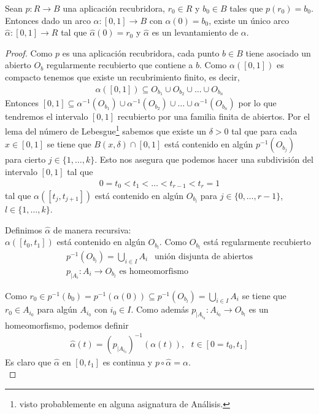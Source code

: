 \begin{lema}
    Sean $p:R\to B$ una aplicación recubridora, $r_0\in R$ y $b_0\in B$ tales que $p(r_0)=b_0$. Entonces dado un arco $\alpha:[0,1]\to B$ con $\alpha(0)=b_0$, existe un único arco $\hat{\alpha}:[0,1]\to R$ tal que $\hat{\alpha}(0) = r_0$ y $\hat{\alpha}$ es un levantamiento de $\alpha$.

    \begin{proof}
        Como $p$ es una aplicación recubridora, cada punto $b\in B$ tiene asociado un abierto $O_b$ regularmente recubierto que contiene a $b$. Como $\alpha([0,1])$ es compacto tenemos que existe un recubrimiento finito, es decir,
        \begin{gather*}
            \alpha([0,1]) \subseteq O_{b_1} \cup O_{b_2}\cup \dots \cup O_{b_n}
        \end{gather*}
        Entonces $[0,1]\subseteq \alpha^{-1}( O_{b_1}) \cup \alpha^{-1}(O_{b_2})\cup \dots \cup \alpha^{-1}(O_{b_n})$ por lo que tendremos el intervalo $[0,1]$ recubierto por una familia finita de abiertos. Por el lema del número de Lebesgue\footnote{visto probablemente en alguna asignatura de Análisis.} sabemos que existe un $\delta>0$ tal que para cada $x\in[0,1]$ se tiene que $B(x,\delta)\cap[0,1]$ está contenido en algún $p^{-1}(O_{b_j})$ para cierto $j\in\{1,\dots,k\}$. Esto nos asegura que podemos hacer una subdivisión del intervalo $[0,1]$ tal que
        \begin{gather*}
            0 = t_0 < t_1 < \dots < t_{r-1} < t_r = 1
        \end{gather*}
        tal que $\alpha([t_j, t_{j+1}])$ está contenido en algún $O_{b_l}$ para $j\in\{0,\dots,r-1\}$, $l\in\{1,\dots,k\}$.

        Definimos $\hat{\alpha}$ de manera recursiva:\\

       $ \alpha([t_0,t_1])$ está contenido en algún $O_{b_l}$. Como $O_{b_l}$ está regularmente recubierto
       \begin{gather*}
            p^{-1}(O_{b_l}) = \bigcup\limits_{i\in I} A_i\ \ \text{ unión disjunta de abiertos}\\
            p_{|A_i}: A_i \to O_{b_l} \text{ es homeomorfismo}
       \end{gather*}

       Como $r_0\in p^{-1}(b_0) = p^{-1}(\alpha(0)) \subseteq p^{-1}(O_{b_l}) = \bigcup\limits_{i\in I}A_i$ se tiene que $r_0\in A_{i_0}$ para algún $A_{i_0}$ con $i_0\in I$. Como además $p_{|A_{i_0}}:A_{i_0} \to O_{b_l}$ es un homeomorfismo, podemos definir
       \begin{gather*}
            \hat{\alpha}(t) = (p_{|A_{i_0}})^{-1}(\alpha(t)),\ \ \ t\in [0=t_0, t_1]
       \end{gather*}
       Es claro que $\hat{\alpha}$ en $[0,t_1]$ es continua y $p\circ\hat{\alpha}=\alpha$.\\


\end{proof}
\end{lema}
